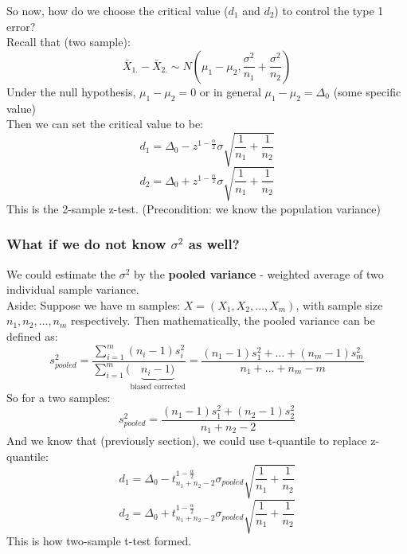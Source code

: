 \documentclass[12pt ]{article}
\begin{document}
So now, how do we choose the critical value ($d_{1}$ and $d_{2}$) to control the type 1 error? \\
Recall that (two sample):
\begin{equation*}
\bar{X}_{1.} - \bar{X}_{2.} \sim N(\mu_{1} - \mu_{2}, \frac{\sigma^2}{n_{1}} + \frac{\sigma^2}{n_{2}})
\end{equation*}
Under the null hypothesis, $\mu_{1} - \mu_{2} = 0$ or in general $\mu_{1} - \mu_{2} = \Delta_{0}$ (some specific value) \\
Then we can set the critical value to be:
\begin{equation*}
d_{1} = \Delta_{0} - z^{1 - \frac{\alpha}{2}} \sigma \sqrt{\frac{1}{n_{1}} + \frac{1}{n_{2}}}
\end{equation*}
\begin{equation*}
d_{2} = \Delta_{0} + z^{1 - \frac{\alpha}{2}} \sigma \sqrt{\frac{1}{n_{1}} + \frac{1}{n_{2}}}
\end{equation*}
This is the 2-sample z-test. (Precondition: we know the population variance)

\subsubsection{What if we do not know $\sigma^2$ as well?}
We could estimate the $\sigma^2$ by the \textbf{pooled variance} - weighted average of two individual sample variance. \\
\color{brown}
Aside:
Suppose we have m samples: $X = (X_{1}, X_{2}, \ldots, X_{m})$, with sample size $n_{1}, n_{2}, \ldots, n_{m}$ respectively. Then mathematically, the pooled variance can be defined as:
\begin{equation*}
s_{pooled}^2 = \frac{\sum_{i=1}^{m}(n_{i} - 1)s_{i}^2}{\sum_{i=1}^{m}(\underbrace{n_{i} - 1)}_{\text{biased corrected}}} = \frac{(n_{1}-1)s_{1}^2 + \ldots + (n_{m} - 1)s_{m}^2}{n_{1} + \ldots + n_{m} - m}
\end{equation*}
\color{black}
So for a two samples:
\begin{equation*}
s_{pooled}^2 = \frac{(n_{1} - 1)s_{1}^2 + (n_{2} - 1)s_{2}^2}{n_{1} + n_{2} - 2}
\end{equation*}
And we know that (previously section), we could use t-quantile to replace z-quantile:
\begin{equation*}
d_{1} = \Delta_{0} - t^{1 - \frac{\alpha}{2}}_{n_{1} + n_{2} - 2} \sigma_{pooled} \sqrt{\frac{1}{n_{1}} + \frac{1}{n_{2}}}
\end{equation*}
\begin{equation*}
d_{2} = \Delta_{0} + t^{1 - \frac{\alpha}{2}}_{n_{1} + n_{2} - 2} \sigma_{pooled} \sqrt{\frac{1}{n_{1}} + \frac{1}{n_{2}}}
\end{equation*}
This is how two-sample t-test formed.
\end{document}
